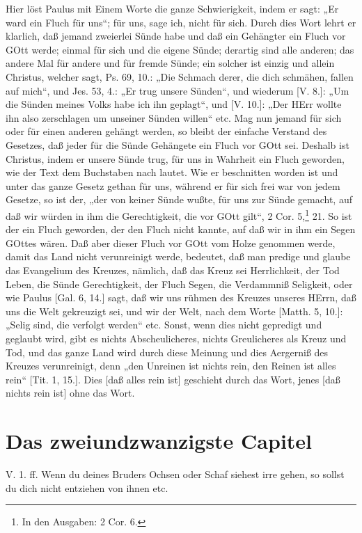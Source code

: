 Hier löst Paulus mit Einem Worte die ganze Schwierigkeit, indem er sagt: „Er ward ein Fluch für uns“; für uns, sage ich, nicht für sich. Durch dies Wort lehrt er klarlich, daß jemand zweierlei Sünde habe und daß ein Gehängter ein Fluch vor GOtt werde; einmal für sich und die eigene Sünde; derartig sind alle anderen; das andere Mal für andere und für fremde Sünde; ein solcher ist einzig und allein Christus, welcher sagt, Ps. 69, 10.: „Die Schmach derer, die dich schmähen, fallen auf mich“, und Jes. 53, 4.: „Er trug unsere Sünden“, und wiederum [V. 8.]: „Um die Sünden meines Volks habe ich ihn geplagt“, und [V. 10.]: „Der HErr wollte ihn also zerschlagen um unseiner
Sünden willen“ etc. Mag nun jemand für sich oder für einen anderen gehängt werden, so bleibt der einfache Verstand des Gesetzes, daß jeder für die Sünde Gehängete ein Fluch vor GOtt sei. Deshalb ist Christus, indem er unsere Sünde trug, für uns in Wahrheit ein Fluch geworden, wie der Text dem Buchstaben nach lautet. Wie er beschnitten worden ist und unter das ganze Gesetz gethan für uns, während er für sich frei war von jedem Gesetze, so ist der, „der von keiner Sünde wußte, für uns zur Sünde gemacht, auf daß wir würden in ihm die Gerechtigkeit, die vor GOtt gilt“, 2 Cor. 5,\footnote{In den Ausgaben: 2 Cor. 6.} 21. So ist der ein Fluch geworden, der den Fluch nicht kannte, auf daß wir in ihm ein Segen GOttes wären. Daß aber dieser Fluch vor GOtt vom Holze genommen werde, damit das Land nicht verunreinigt werde, bedeutet, daß man predige und glaube das Evangelium des Kreuzes, nämlich, daß das Kreuz sei Herrlichkeit, der Tod Leben, die Sünde Gerechtigkeit, der Fluch Segen, die Verdammniß Seligkeit, oder wie Paulus [Gal. 6, 14.] sagt, daß wir uns rühmen des Kreuzes unseres HErrn, daß uns die Welt gekreuzigt sei, und wir der Welt, nach dem Worte [Matth. 5, 10.]: „Selig sind, die verfolgt werden“ etc. Sonst, wenn dies nicht gepredigt und geglaubt wird, gibt es nichts Abscheulicheres, nichts Greulicheres als Kreuz und Tod, und das ganze Land wird durch diese Meinung und dies Aergerniß des Kreuzes verunreinigt, denn „den Unreinen ist nichts rein, den Reinen ist alles rein“ [Tit. 1, 15.]. Dies [daß alles rein ist] geschieht durch das Wort, jenes [daß nichts rein ist] ohne das Wort.

\section{Das zweiundzwanzigste Capitel}

\begin{schriftzitat}
V. 1. ff. Wenn du deines Bruders Ochsen oder Schaf siehest irre gehen, so sollst du dich nicht entziehen von ihnen etc.
\end{schriftzitat}

